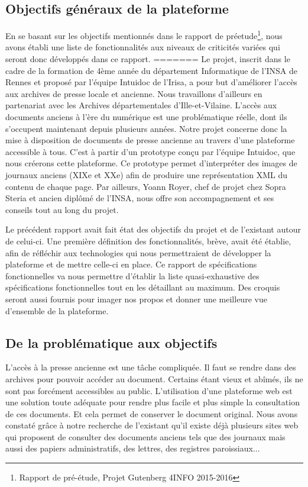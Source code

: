     \subsection{Objectifs généraux de la plateforme}
    \label{sec:objectifs}
    En se basant sur les objectifs mentionnés dans le rapport de préetude\footnote{Rapport de pré-étude, Projet Gutenberg 4INFO 2015-2016}, nous avons établi une liste de fonctionnalités aux niveaux de criticités variées qui seront donc développés dans ce rapport.
=======
Le projet, inscrit dans le cadre de la formation de 4ème année du département Informatique de l’INSA de Rennes et proposé par l’équipe Intuidoc de l’Irisa, a pour but d’améliorer l’accès aux archives de presse locale et ancienne. Nous travaillons d'ailleurs en partenariat avec les Archives départementales d'Ille-et-Vilaine. L'accès aux documents anciens à l'ère du numérique est une problématique réelle, dont ils s'occupent maintenant depuis plusieurs années. Notre projet concerne donc la mise à disposition de documents de presse ancienne au travers d'une plateforme accessible à tous. C'est à partir d'un prototype conçu par l'équipe Intuidoc, que nous créerons cette plateforme. Ce prototype permet d'interpréter des images de journaux anciens (XIXe et XXe) afin de produire une représentation XML du contenu de chaque page. Par ailleurs, Yoann Royer, chef de projet chez Sopra Steria et ancien diplômé de l'INSA, nous offre son accompagnement et ses conseils tout au long du projet.

Le précédent rapport avait fait état des objectifs du projet et de l'existant autour de celui-ci. Une première définition des fonctionnalités, brève, avait été établie, afin de réfléchir aux technologies qui nous permettraient de développer la plateforme et de mettre celle-ci en place. Ce rapport de spécifications fonctionnelles va nous permettre d'établir la liste quasi-exhaustive des spécifications fonctionnelles tout en les détaillant au maximum. Des croquis seront aussi fournis pour imager nos propos et donner une meilleure vue d'ensemble de la plateforme.

    \subsection{De la problématique aux objectifs}
		\label{sec:probleme}
		
		L'accès à la presse ancienne est une tâche compliquée. Il faut se rendre dans des archives pour pouvoir accéder au document. Certains étant vieux et abîmés, ils ne sont pas forcément accessibles au public. L'utilisation d'une plateforme web est une solution toute adéquate pour rendre plus facile et plus simple la consultation de ces documents. Et cela permet de conserver le document original. Nous avons constaté grâce à notre recherche de l'existant qu'il existe déjà plusieurs sites web qui proposent de consulter des documents anciens tels que des journaux mais aussi des papiers administratifs, des lettres, des registres paroissiaux... 
		

